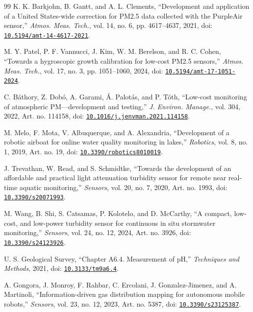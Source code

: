 \documentclass[11pt,a4paper]{article}
\begin{document}
\begin{thebibliography}{99}
K. K. Barkjohn, B. Gantt, and A. L. Clements, “Development and application of a United States-wide correction for PM2.5 data collected with the PurpleAir sensor,” \textit{Atmos. Meas. Tech.}, vol. 14, no. 6, pp. 4617--4637, 2021, doi: \href{https://doi.org/10.5194/amt-14-4617-2021}{\nolinkurl{10.5194/amt-14-4617-2021}}.

M. Y. Patel, P. F. Vannucci, J. Kim, W. M. Berelson, and R. C. Cohen, “Towards a hygroscopic growth calibration for low-cost PM2.5 sensors,” \textit{Atmos. Meas. Tech.}, vol. 17, no. 3, pp. 1051--1060, 2024, doi: \href{https://doi.org/10.5194/amt-17-1051-2024}{\nolinkurl{10.5194/amt-17-1051-2024}}.

C. Báthory, Z. Dobó, A. Garami, Á. Palotás, and P. Tóth, “Low-cost monitoring of atmospheric PM---development and testing,” \textit{J. Environ. Manage.}, vol. 304, 2022, Art. no. 114158, doi: \href{https://doi.org/10.1016/j.jenvman.2021.114158}{\nolinkurl{10.1016/j.jenvman.2021.114158}}.

M. Melo, F. Mota, V. Albuquerque, and A. Alexandria, “Development of a robotic airboat for online water quality monitoring in lakes,” \textit{Robotics}, vol. 8, no. 1, 2019, Art. no. 19, doi: \href{https://doi.org/10.3390/robotics8010019}{\nolinkurl{10.3390/robotics8010019}}.

J. Trevathan, W. Read, and S. Schmidtke, “Towards the development of an affordable and practical light attenuation turbidity sensor for remote near real-time aquatic monitoring,” \textit{Sensors}, vol. 20, no. 7, 2020, Art. no. 1993, doi: \href{https://doi.org/10.3390/s20071993}{\nolinkurl{10.3390/s20071993}}.

M. Wang, B. Shi, S. Catsamas, P. Kolotelo, and D. McCarthy, “A compact, low-cost, and low-power turbidity sensor for continuous in situ stormwater monitoring,” \textit{Sensors}, vol. 24, no. 12, 2024, Art. no. 3926, doi: \href{https://doi.org/10.3390/s24123926}{\nolinkurl{10.3390/s24123926}}.

U. S. Geological Survey, “Chapter A6.4. Measurement of pH,” \textit{Techniques and Methods}, 2021, doi: \href{https://doi.org/10.3133/tm9a6.4}{\nolinkurl{10.3133/tm9a6.4}}.

A. Gongora, J. Monroy, F. Rahbar, C. Ercolani, J. Gonzalez-Jimenez, and A. Martinoli, “Information-driven gas distribution mapping for autonomous mobile robots,” \textit{Sensors}, vol. 23, no. 12, 2023, Art. no. 5387, doi: \href{https://doi.org/10.3390/s23125387}{\nolinkurl{10.3390/s23125387}}.


\end{thebibliography}
\end{document}
